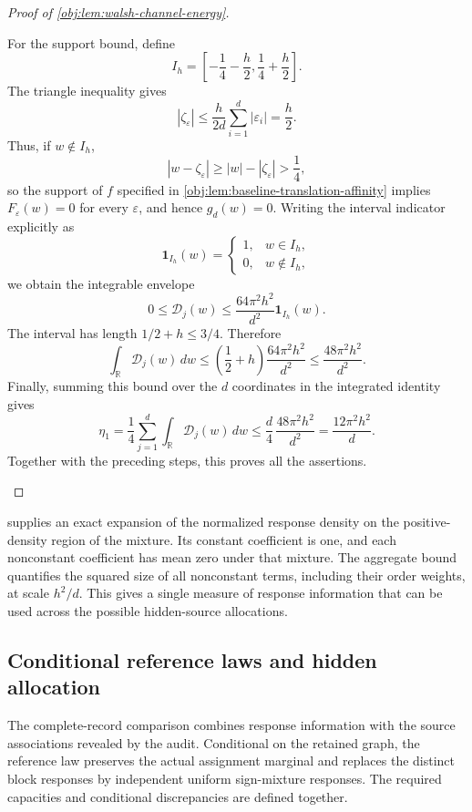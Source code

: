 \documentclass[11pt]{article}
\begin{document}
\begin{proof}[Proof of \cref{obj:lem:walsh-channel-energy}]
\begin{enumerate}
For the support bound, define
\[
I_h=\left[-\frac14-\frac h2,\frac14+\frac h2\right].
\]
The triangle inequality gives
\[
|\zeta_\varepsilon|
\le\frac{h}{2d}\sum_{i=1}^d|\varepsilon_i|
=\frac h2.
\]
Thus, if \(w\notin I_h\),
\[
|w-\zeta_\varepsilon|
\ge |w|-|\zeta_\varepsilon|>\frac14,
\]
so the support of \(f\) specified in
\cref{obj:lem:baseline-translation-affinity} implies
\(F_\varepsilon(w)=0\) for every \(\varepsilon\), and hence \(g_d(w)=0\).
Writing the interval indicator explicitly as
\[
\mathbf1_{I_h}(w)=
\begin{cases}
1,&w\in I_h,\\
0,&w\notin I_h,
\end{cases}
\]
we obtain the integrable envelope
\[
0\le\mathcal D_j(w)
\le\frac{64\pi^2h^2}{d^2}\mathbf1_{I_h}(w).
\]
The interval has length \(1/2+h\le3/4\). Therefore
\[
\int_{\mathbb R}\mathcal D_j(w)\,dw
\le
\left(\frac12+h\right)\frac{64\pi^2h^2}{d^2}
\le\frac{48\pi^2h^2}{d^2}.
\]
Finally, summing this bound over the \(d\) coordinates in the integrated identity gives
\[
\eta_1
=\frac14\sum_{j=1}^d\int_{\mathbb R}\mathcal D_j(w)\,dw
\le\frac d4\,\frac{48\pi^2h^2}{d^2}
=\frac{12\pi^2h^2}{d}.
\]
Together with the preceding steps, this proves all the assertions.
\end{enumerate}
\end{proof}

 supplies an exact expansion of the normalized response density on the positive-density region of the mixture. Its constant coefficient is one, and each nonconstant coefficient has mean zero under that mixture. The aggregate bound quantifies the squared size of all nonconstant terms, including their order weights, at scale \(h^2/d\). This gives a single measure of response information that can be used across the possible hidden-source allocations.

\subsection{Conditional reference laws and hidden allocation}

The complete-record comparison combines response information with the source associations revealed by the audit. Conditional on the retained graph, the reference law preserves the actual assignment marginal and replaces the distinct block responses by independent uniform sign-mixture responses. The required capacities and conditional discrepancies are defined together.
\end{document}

